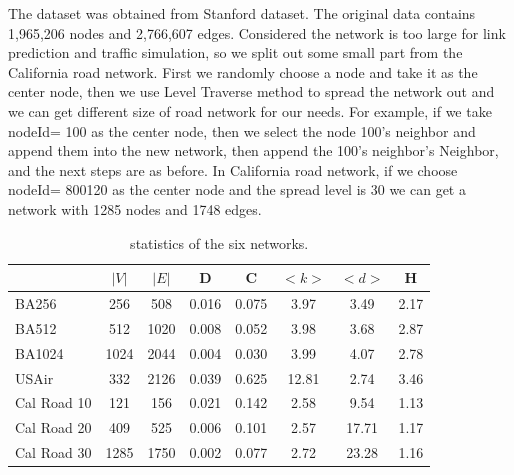 \documentclass[onecolumn,preprintnumbers,amsmath,amssymb]{revtex4}
\begin{document}

The dataset was obtained from Stanford dataset. The original data contains 1,965,206 nodes and 2,766,607 edges. Considered the network is too large for link prediction and traffic simulation, so we split out some small part from the California road network. First we randomly choose a node and take it as the center node, then we use Level Traverse method to spread the network out and we can get different size of road network for our needs. For example, if we take nodeId= 100 as the center node, then we select the node 100’s neighbor and append them into the new network, then append the 100’s neighbor’s Neighbor, and the next steps are as before. In California road network, if we choose nodeId= 800120 as the center node and the spread level is 30 we can get a network with 1285 nodes and 1748 edges.


\begin{table}[tbp]
\centering  %
\begin{tabular}{lccccccc}  %
\hline  %
&$|V|$ &$|E|$ &D &C &$<k>$ &$<d>$ &H\\ 
\hline  BA256 &256 &508 &0.016 &0.075 &3.97 &3.49 &2.17 \\  
\hline  BA512 &512 &1020 &0.008 &0.052 &3.98 &3.68 &2.87 \\
\hline  BA1024 &1024 &2044 &0.004 &0.030 &3.99 &4.07 &2.78\\
\hline USAir &332 &2126 &0.039 &0.625 &12.81 &2.74 &3.46\\
\hline Cal Road 10 &121 &156 &0.021 &0.142 &2.58 &9.54 &1.13\\
\hline Cal Road 20 &409 &525 &0.006 &0.101 &2.57 &17.71 &1.17\\
\hline Cal Road 30 &1285 &1750 &0.002 &0.077 &2.72 &23.28 &1.16\\
\hline
\end{tabular}
\caption{statistics of the six networks.}
\end{table}
\end{document}
